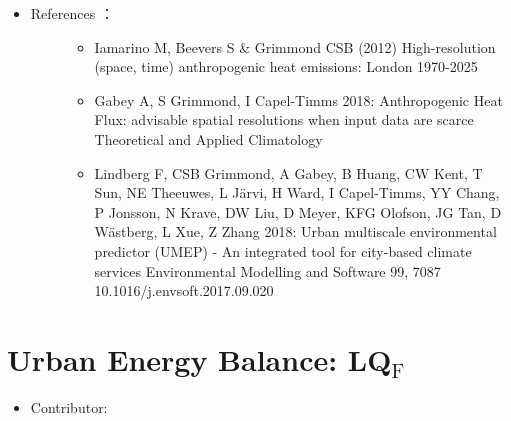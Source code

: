 \documentclass[letterpaper,10pt,english]{sphinxmanual}
\begin{document}
\begin{itemize}
\item {} \begin{description}
\item[{References  ：}] \leavevmode\begin{itemize}
\item {} 
Iamarino M, Beevers S \& Grimmond CSB (2012) High-resolution (space, time) anthropogenic heat emissions: London 1970-2025 

\item {} 
Gabey A, S Grimmond, I Capel-Timms 2018: Anthropogenic Heat Flux: advisable spatial resolutions when input data are scarce Theoretical and Applied Climatology 

\item {} 
Lindberg F, CSB Grimmond, A Gabey, B Huang, CW Kent, T Sun, NE Theeuwes, L Järvi, H Ward, I Capel-Timms, YY Chang, P Jonsson, N Krave, DW Liu, D Meyer, KFG Olofson, JG Tan, D Wästberg, L Xue, Z Zhang 2018: Urban multiscale environmental predictor (UMEP) - An integrated tool for city-based climate services Environmental Modelling and Software 99, 70\textendash{}87 10.1016/j.envsoft.2017.09.020

\end{itemize}

\end{description}

\end{itemize}


\section{Urban Energy Balance: LQ$_{\text{F}}$}
\label{\detokenize{processor/Urban Energy Balance LQ:urban-energy-balance-lqf}}\label{\detokenize{processor/Urban Energy Balance LQ:lqf}}\label{\detokenize{processor/Urban Energy Balance LQ::doc}}\begin{itemize}
\item {} 
Contributor:

\end{itemize}
\end{document}

